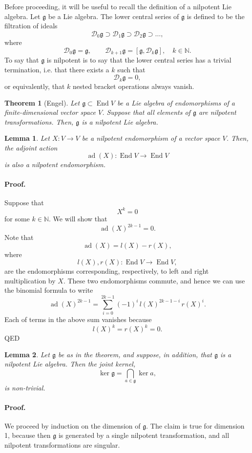 \documentclass[12pt]{article}
\newcommand{\lag}{\mathfrak{g}}
\newcommand{\ad}{\mathop{\mathrm{ad}}\nolimits}
\newcommand{\End}{\mathop{\mathrm{End}}\nolimits}
\newcommand{\cD}{\mathcal{D}}
\newtheorem{theorem}{Theorem}
\newtheorem{lemma}{Lemma}
\newcommand{\natnums}{\mathbb{N}}
\begin{document}
Before proceeding, it will be useful to recall the definition of a
nilpotent Lie algebra.  Let $\lag$ be a Lie algebra.  The lower central series of $\lag$ is defined to be the filtration of ideals
$$\cD_0\lag \supset \cD_1\lag \supset \cD_2\lag \supset\ldots,$$
where 
$$\cD_0\lag = \lag,\qquad \cD_{k+1}\lag = [\lag,\cD_k\lag],\quad k\in
\natnums.$$
To say that $\lag$ is nilpotent is to say that the lower
central  series has a trivial termination, i.e. that there exists a $k$
such that 
$$\cD_k\lag = 0,$$
or equivalently, that $k$ nested bracket operations
always vanish.

\begin{theorem}[Engel]
  Let $\lag\subset\End V$ be a Lie algebra of endomorphisms of a
finite-dimensional vector space $V$.  Suppose that all elements of
$\lag$ are nilpotent transformations. Then, $\lag$ is a nilpotent Lie
algebra.
\end{theorem}

\begin{lemma}
  Let $X:V\rightarrow V$ be a nilpotent endomorphism of a  vector
  space $V$. Then, the adjoint action
  $$\ad(X):\End V\rightarrow \End V$$
  is also a nilpotent endomorphism.
\end{lemma}
\paragraph{Proof.}
Suppose that $$X^k=0$$
for some $k\in\natnums$.  We will show that
$$\ad(X)^{2k-1}=0.$$
Note that 
$$\ad(X) = l(X)-r(X),$$
where
$$l(X), r(X):\End V\rightarrow \End V,$$
are the endomorphisms
corresponding, respectively, to left and right multiplication by $X$.
These two endomorphisms commute, and hence we can use the binomial
formula to write
$$\ad(X)^{2k-1} = \sum_{i=0}^{2k-1} (-1)^i\, l(X)^{2k-1-i}\, r(X)^i.$$
Each of terms in the above sum vanishes because
$$l(X)^k = r(X)^k = 0.$$
QED

\begin{lemma}
  Let $\lag$ be as in the theorem, and suppose, in addition, that
  $\lag$ is a nilpotent Lie algebra. Then the joint kernel,
  $$\ker \lag = \bigcap_{a\in\lag} \ker a,$$
  is non-trivial.
\end{lemma}

\paragraph{Proof.}  We proceed by induction on the dimension of $\lag$.  
The claim is true for dimension 1, because then $\lag$ is generated by
a single nilpotent transformation, and all nilpotent transformations
are singular.
\end{document}
